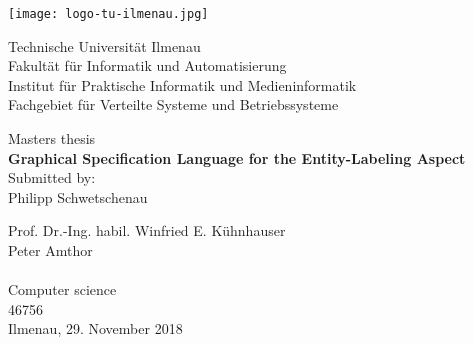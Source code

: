 \documentclass[twoside, openright, 12pt]{book}
\begin{document}
%
\begin{titlepage}
\newlength{\detailwidth}
\newlength{\detaildescriptionwidth}
\settowidth{\detailwidth}{Eingereicht:~~ Prof. Dr.-Ing. habil. Winfried E. Kühnhauser}
\settowidth{\detaildescriptionwidth}{Studies:~~} 
\begin{center}

\vfill {
	\texttt{[image: logo-tu-ilmenau.jpg]}
	\vspace{8ex}
}

\begin{normalsize}Technische Universität Ilmenau \\
Fakultät für Informatik und Automatisierung \\
Institut für Praktische Informatik und Medieninformatik \\
Fachgebiet für Verteilte Systeme und Betriebssysteme        
\end{normalsize}


\vfill {\large
	Masters thesis\\ \vspace{2ex}
	\LARGE \textbf{Graphical Specification Language for the Entity-Labeling Aspect} \\ \vspace{2.5ex} 
	\normalsize Submitted by: \\
	\Large Philipp Schwetschenau \\ \vspace{3ex} 
}
\vfill \parbox{\detailwidth}{
	 Prof. Dr.-Ing. habil. Winfried E. Kühnhauser \\
	 Peter Amthor \\
	\vspace{2ex} \\
	 Computer science\\  
	 46756  
	\vspace{2ex} \\
	 Ilmenau, 29. November 2018 
}
\vspace*{\fill}
\end{center}
\end{titlepage}

\mbox{}
\thispagestyle{empty}
\cleardoublepage

\setcounter{page}{1}
\tableofcontents
\end{document}
